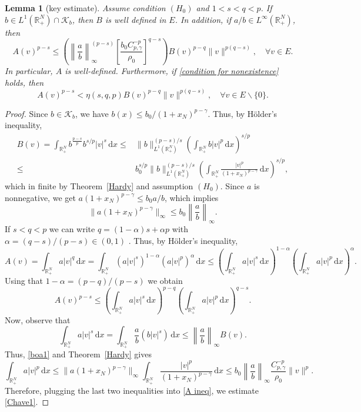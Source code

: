 \documentclass[12pt,reqno]{amsart}
\newtheorem{lemma}[theorem]{Lemma}
\begin{document}
\begin{lemma}[key estimate]\label{Estimativa1} Assume condition $(H_0)$ and $1<s<q <p$. 
If $b\in L^1(\mathds{R}^N_+)\cap \mathcal{K}_b$, then  $B$ is well defined in $E$. 
In addition, if $a/b\in L^{\infty}(\mathds{R}^N_+)$, then 
		\begin{equation}\label{Chave1}
			A(v)^{p-s}\leq \left(\left\|\frac{a}{b}\right\|_{\infty}^{(p-s)}	\left[\frac{b_0C_{p,\gamma}^{-p}}{\rho_0}\right]^{q-s}\right)B(v)^{p-q}\|v\|^{p(q-s)},
   \quad \forall v\in  E.
		\end{equation}
		In particular, $A$ is well-defined. Furthermore, if \eqref{condition for nonexistence} holds, then  
		\begin{equation}\label{Estima2}
			A(v)^{p-s}<\eta(s,q,p)B(v)^{p-q}\|v\|^{p(q-s)},    \quad \forall v\in E\backslash\{0\}.
		\end{equation}
\end{lemma}
 \begin{proof}
 Since $b\in\mathcal{K}_b$, we have $b(x)\leq b_0/(1+x_N)^{p-\gamma}$. 
 Thus, by H\"{o}lder's inequality, 
		\begin{align*}
			B(v)=\int_{\mathds{R}^{N}_+}b^{\frac{p-s}{p}}b^{s/p}|v|^s\, \mathrm{d} x
			\leq& \|b\|_{L^1(\mathds{R}^N_+)}^{(p-s)/s}\left(\int_{\mathds{R}^{N}_+}b|v|^p\, \mathrm{d} x\right)^{s/p}\\
			\leq& b_0^{s/p}\|b\|_{L^1(\mathds{R}^N_+)}^{(p-s)/s}\left(\int_{\mathds{R}^{N}_+}\frac{|v|^p}{(1+x_N)^{p-\gamma}}\, \mathrm{d} x\right)^{s/p},
		\end{align*}
which in finite by Theorem~\ref{Hardy} and assumption $(H_0)$.  Since  $a$ is nonnegative, we get 
$a(1+x_N)^{p-\gamma}\leq b_0a/b$, which implies 
 \begin{equation}\label{boa1}
 \|a(1+x_N)^{p-\gamma}\|_\infty\leq b_0\left\|\frac{a}{b}\right\|_\infty .
 \end{equation}
 If $s<q<p$ we can write $q=(1-\alpha)s+\alpha p$ with $\alpha=(q-s)/(p-s)\in (0,1)$ . 
 Thus, by H\"{o}lder's inequality,
		\[
A(v)=\int_{\mathds{R}^{N}_+}a|v|^q\, \mathrm{d} x=\int_{\mathds{R}^{N}_+} (a|v|^s)^{1-\alpha}(a|v|^p)^\alpha \, \mathrm{d} x\leq \left(\int_{\mathds{R}^{N}_+}a|v|^s\, \mathrm{d} x\right)^{1-\alpha}\left(\int_{\mathds{R}^{N}_+} a|v|^p\, \mathrm{d} x\right)^{\alpha}.
\]
Using that $1-\alpha=(p-q)/(p-s)$ we obtain
\begin{equation}\label{A ineq}
			A(v)^{p-s}\leq \left(\int_{\mathds{R}^{N}_+}a|v|^s\, \mathrm{d} x\right)^{p-q}\left(\int_{\mathds{R}^{N}_+} a|v|^p\, \mathrm{d} x\right)^{q-s}.
   \end{equation}
Now, observe that 
   $$
   \int_{\mathds{R}^{N}_+} a|v|^s\, \mathrm{d} x=\int_{\mathds{R}^{N}_+} \frac{a}{b}\left(b|v|^s\right)\, \mathrm{d} x\leq\left\|\frac{a}{b}\right\|_\infty B(v).
   $$
   Thus, \eqref{boa1} and Theorem~\ref{Hardy} gives
   $$
   \int_{\mathds{R}^{N}_+} a|v|^p\, \mathrm{d} x\leq\|a(1+x_N)^{p-\gamma}\|_\infty\int_{\mathds{R}^{N}_+}\frac{|v|^p}{(1+x_N)^{p-\gamma}}\, \mathrm{d} x\leq b_0\left\|\frac{a}{b}\right\|_\infty \frac{C^{-p}_{p,\gamma}}{\rho_0}\|v\|^p.
   $$
Therefore, plugging the last two inequalities into \eqref{A ineq}, we estimate \eqref{Chave1}.
\end{proof}
\end{document}
